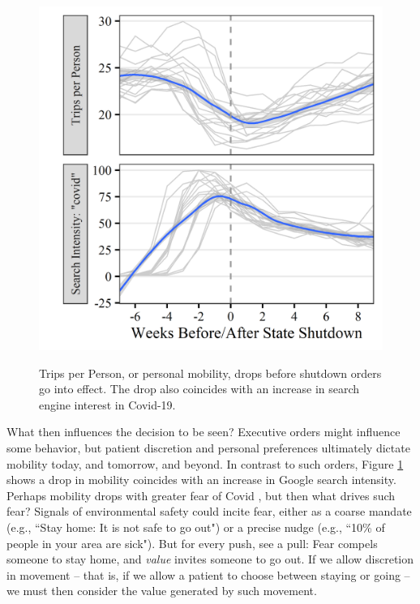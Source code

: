  \begin{figure}[!b]
    \centering
    \caption{Trips per Person, or personal mobility, drops before shutdown orders go into effect. The drop also coincides with an increase in search engine interest in Covid-19.}
    \includegraphics[scale=1]{Figures/VC2/MotFig-Take2.png}     
    \label{fig:t2_mot_fig}
 \end{figure}  
 
 What then influences the decision to be seen? Executive orders might influence some behavior, but patient discretion and personal preferences ultimately dictate mobility today, and tomorrow, and beyond. In contrast to such orders, Figure \ref{fig:t2_mot_fig} shows a drop in mobility coincides with an increase in Google search intensity. Perhaps mobility drops with greater fear of Covid \citep{Alfaro2020}, but then what drives such fear? Signals of environmental safety could incite fear, either as a coarse mandate (e.g., “Stay home: It is not safe to go out") or a precise nudge (e.g., “10\% of people in your area are sick"). But for every push, see a pull: Fear compels someone to stay home, and \textit{value} invites someone to go out. If we allow discretion in movement -- that is, if we allow a patient to choose between staying or going -- we must then consider the value generated by such movement.
 
